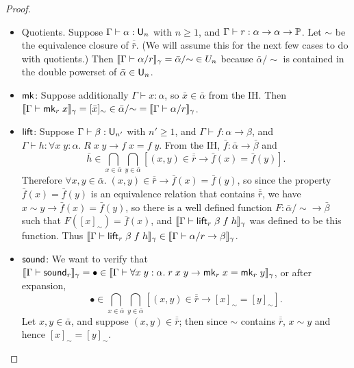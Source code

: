 \begin{proof}
\begin{itemize}
Suppose that for all $y\in\acc(\bar\alpha,\overline{\bar r})$, if $(y,x)\in\overline{\bar r}$ then $F(y)\in\bar C(y)$. Then $F(x)=\bar e(x)(\bullet)(y\in \bar\alpha\mapsto(h\in[(y,x)\in\overline{\bar r}]\mapsto F(y)))$. Clearly $x\in\bar\alpha$, and $\bullet\in[(y,x)\in\overline{\bar r}]$. Also, $(y\in \bar\alpha\mapsto(h\in[(y,x)\in\overline{\bar r}]\mapsto F(y)))\in\prod_{y\in\bar\alpha}[(y,x)\in\overline{\bar r}]\to\bar C(y)$ because if $y\in\bar\alpha$ and $h\in[(y,x)\in\overline{\bar r}]$, then $(y,x)\in\overline{\bar r}$ so $F(y)\in\bar C(y)$ by the IH. Thus $F(x)\in\bar C(x)$.
\item Quotients. Suppose $\Gamma\vdash\alpha:\U_n$ with $n\ge 1$, and $\Gamma\vdash r:\alpha\to\alpha\to\P$. Let $\sim$ be the equivalence closure of $\overline{\bar r}$. (We will assume this for the next few cases to do with quotients.) Then $\scott{\Gamma\vdash \alpha/r}_\gamma=\bar\alpha/{\sim}\in U_n$ because $\bar\alpha/{\sim}$ is contained in the double powerset of $\bar\alpha\in\mathsf{U}_n$.
\item $\mathsf{mk}$: Suppose additionally $\Gamma\vdash x:\alpha$, so $\bar x\in\bar \alpha$ from the IH. Then $\scott{\Gamma\vdash\mk_r\;x}_\gamma=[\bar x]_{\sim}\in\bar\alpha/{\sim}=\scott{\Gamma\vdash \alpha/r}_\gamma$.
\item $\mathsf{lift}$: Suppose $\Gamma\vdash\beta:\U_{n'}$ with $n'\ge 1$, and $\Gamma\vdash f:\alpha\to\beta$, and\\
$\Gamma\vdash h:\forall x\;y:\alpha.\;R\;x\;y\to f\;x=f\;y$. From the IH, $\bar f:\bar\alpha\to\bar\beta$ and
$$\bar h\in\bigcap_{x\in\bar\alpha}\bigcap_{y\in\bar\alpha}[(x,y)\in\overline{\bar r}\to\bar f(x)=\bar f(y)].$$
Therefore $\forall x,y\in \bar\alpha.\;(x,y)\in\overline{\bar r}\to\bar f(x)=\bar f(y)$, so since the property $\bar f(x)=\bar f(y)$ is an equivalence relation that contains $\overline{\bar r}$, we have $x\sim y\to \bar f(x)=\bar f(y)$, so there is a well defined function $F:\bar\alpha/{\sim}\to\bar\beta$ such that $F([x]_{\sim})=\bar f(x)$, and $\scott{\Gamma\vdash\lift_r\;\beta\;f\;h}_\gamma$ was defined to be this function. Thus $\scott{\Gamma\vdash\lift_r\;\beta\;f\;h}_\gamma\in \scott{\Gamma\vdash\alpha/r\to\beta}_\gamma$.
\item $\mathsf{sound}$: We want to verify that $\scott{\Gamma\vdash\sound_r}_\gamma=\bullet\in\scott{\Gamma\vdash\forall x\;y:\alpha.\;r\;x\;y\to\mk_r\;x=\mk_r\;y}_\gamma$, or after expansion,
$$\bullet\in\bigcap_{x\in\bar\alpha}\bigcap_{y\in\bar\alpha}[(x,y)\in\overline{\bar r}\to[x]_{\sim}=[y]_{\sim}].$$
Let $x,y\in\bar\alpha$, and suppose $(x,y)\in\overline{\bar r}$; then since $\sim$ contains $\overline{\bar r}$, $x\sim y$ and hence $[x]_{\sim}=[y]_{\sim}$.

\end{itemize}
\end{proof}
